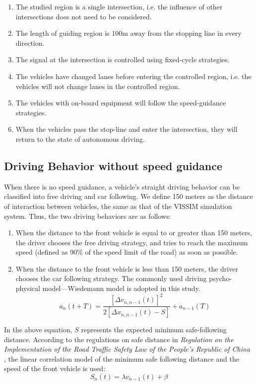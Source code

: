 \documentclass[10.5pt,compsoc]{TsT}
\theoremstyle{mystyle}
\newcommand{\upcite}[1]{\textsuperscript{\cite{#1}}}
\renewcommand{\labelenumi}{(\arabic{enumi})}
\begin{document}
{\begin{enumerate}
\def\labelenumi{\alph{enumi})}
\item
  The studied region is a single intersection, i.e. the influence of
  other intersections does not need to be considered.
\item
  The length of guiding region is 100m away from the stopping line in
  every direction.
\item
  The signal at the intersection is controlled using fixed-cycle
  strategies.
\item
  The vehicles have changed lanes before entering the controlled region,
  i.e. the vehicles will not change lanes in the controlled region.
\item
  The vehicles with on-board equipment will follow the speed-guidance
  strategies.
\item
  When the vehicles pass the stop-line and enter the intersection, they
  will return to the state of autonomous driving.
\end{enumerate}

\subsection{Driving Behavior without speed guidance}

When there is no speed guidance, a vehicle's straight driving behavior
can be classified into free driving and car following. We define 150
meters as the distance of interaction between vehicles, the same as that
of the VISSIM simulation system. Thus, the two driving behaviors are as
follows:

\begin{enumerate}
\def\labelenumi{\alph{enumi})}
\item
  When the distance to the front vehicle is equal to or greater than 150
  meters, the driver chooses the free driving strategy, and tries to
  reach the maximum speed (defined as 90\% of the speed limit of the
  road) as soon as possible.
\item
  When the distance to the front vehicle is less than 150 meters, the
  driver chooses the car following strategy. The commonly used driving
  psycho-physical model---Wiedemann model \upcite{19} is
  adopted in this study.
$$ a_n(t+T)=\frac{[\Delta v_{n,n-1}(t)]^2}{2[\Delta x_{n,n-1}(t)-S]}+a_{n-1}(T)$$
\end{enumerate}


In the above equation, $S$ represents the expected minimum safe-following
distance. According to the regulations on safe distance in
\emph{Regulation on the Implementation of the Road Traffic Safety Law of
the People's Republic of China} \upcite{20}, the linear
correlation model of the minimum safe following distance and the speed
of the front vehicle is used:
$$S_n(t)=\lambda v_{n-1}(t)+\beta$$

}
\end{document}
